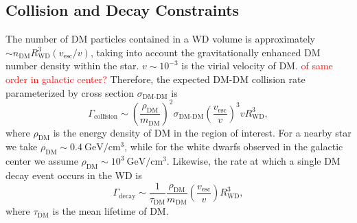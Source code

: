 \documentclass[twocolumn,showpacs,preprintnumbers,amsmath,amssymb,prd]{revtex4}
\newcommand{\GeV}{\text{GeV}}
\def\r{\right)}
\def\l{\left(}
\begin{document}
\subsection{Collision and Decay Constraints}
\label{sec:CollisionConstraints}

The number of DM particles contained in a WD volume is approximately $\sim n_\text{DM} R_\text{WD}^3 (v_\text{esc}/v)$, taking into account the gravitationally enhanced DM number density within the star.
$v \sim 10^{-3}$ is the virial velocity of DM.
\textcolor{red}{of same order in galactic center?} Therefore, the expected DM-DM collision rate parameterized by cross section $\sigma_\text{DM-DM}$ is 
\begin{equation}
\Gamma_\text{collision} \sim \l \frac{\rho_{\text{DM}}}{m_\text{DM}} \r^2 \sigma_\text{DM-DM} \l \frac{v_\text{esc}}{v}\r^3 v R_\text{WD}^3,
\label{eq:collisiongamma}
\end{equation}
where $\rho_{\text{DM}}$ is the energy density of DM in the region of interest.
For a nearby star we take $\rho_\text{DM} \sim 0.4 ~\GeV/\text{cm}^3$, while for the white dwarfs observed in the galactic center we assume $\rho_\text{DM} \sim 10^3 ~\text{GeV}/\text{cm}^3$.
Likewise, the rate at which a single DM decay event occurs in the WD is
\begin{equation}
\Gamma_\text{decay} \sim  \frac{1}{\tau_\text{DM}} \frac{\rho_{\text{DM}}}{m_\text{DM}} \l \frac{v_\text{esc}}{v} \r R_\text{WD}^3,
\label{eq:taugamma}
\end{equation}
where $\tau_\text{DM}$ is the mean lifetime of DM.
\end{document}
